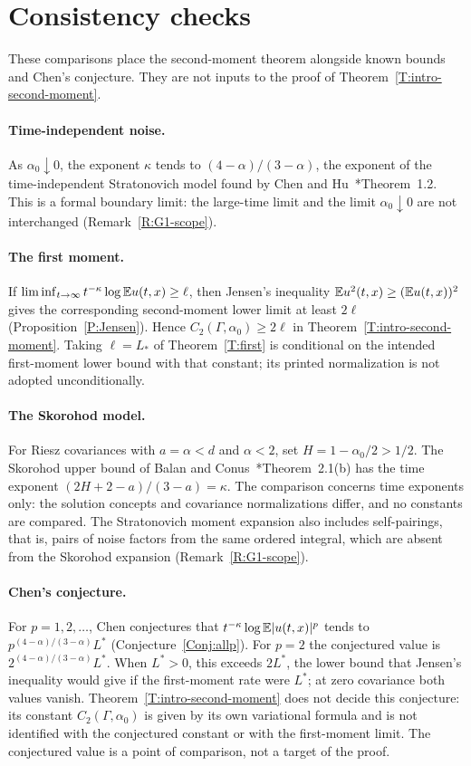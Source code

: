 \section{Consistency checks}\label{S:consistency}

These comparisons place the second-moment theorem alongside known bounds and
Chen's conjecture. They are not inputs to the proof of
Theorem~\ref{T:intro-second-moment}.

\paragraph{Time-independent noise.}
As $\alpha_0\downarrow0$, the exponent $\kappa$ tends to
$(4-\alpha)/(3-\alpha)$, the exponent of the time-independent Stratonovich
model found by Chen and Hu~\cite{chen.hu:25:hyperbolic}*{Theorem~1.2}. This is
a formal boundary limit: the large-time limit and the limit
$\alpha_0\downarrow0$ are not interchanged (Remark~\ref{R:G1-scope}).

\paragraph{The first moment.}
If $\liminf_{t\to\infty}t^{-\kappa}\log\mathbb{E} u(t,x)\ge\ell$, then Jensen's
inequality $\mathbb{E} u^2(t,x)\ge(\mathbb{E} u(t,x))^2$ gives the corresponding second-moment
lower limit at least $2\ell$ (Proposition~\ref{P:Jensen}). Hence
$C_2(\Gamma,\alpha_0)\ge2\ell$ in Theorem~\ref{T:intro-second-moment}. Taking
$\ell=L_*$ of Theorem~\ref{T:first} is conditional on the intended first-moment
lower bound with that constant; its printed normalization is not adopted
unconditionally.

\paragraph{The Skorohod model.}
For Riesz covariances with $a=\alpha<d$ and $\alpha<2$, set
$H=1-\alpha_0/2>1/2$. The Skorohod upper bound of Balan and
Conus~\cite{balan.conus:16:intermittency}*{Theorem~2.1(b)} has the time
exponent $(2H+2-a)/(3-a)=\kappa$. The comparison concerns time exponents only:
the solution concepts and covariance normalizations differ, and no constants
are compared. The Stratonovich moment expansion also includes self-pairings,
that is, pairs of noise factors from the same ordered integral, which are
absent from the Skorohod expansion (Remark~\ref{R:G1-scope}).

\paragraph{Chen's conjecture.}
For $p=1,2,\dots$, Chen conjectures that $t^{-\kappa}\log\mathbb{E}|u(t,x)|^p$ tends to
$p^{(4-\alpha)/(3-\alpha)}L^*$ (Conjecture~\ref{Conj:allp}). For $p=2$ the
conjectured value is $2^{(4-\alpha)/(3-\alpha)}L^*$. When $L^*>0$, this exceeds
$2L^*$, the lower bound that Jensen's inequality would give if the first-moment
rate were $L^*$; at zero covariance both values vanish.
Theorem~\ref{T:intro-second-moment} does not decide this conjecture: its
constant $C_2(\Gamma,\alpha_0)$ is given by its own variational formula and is
not identified with the conjectured constant or with the first-moment limit.
The conjectured value is a point of comparison, not a target of the proof.
